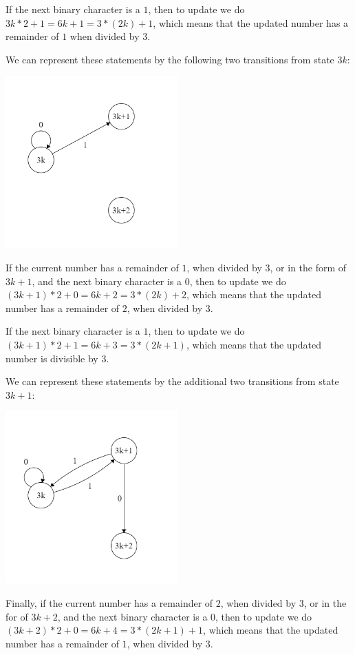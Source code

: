 If the next binary character is a $1$, then to update we do $3k*2+1=6k+1=3*(2k)+1$, which means that the updated number has a remainder of $1$ when divided by $3$.

We can represent these statements by the following two transitions from state $3k$:

\includegraphics[width=250px]{02/modulo_1.png}

If the current number has a remainder of $1$, when divided by $3$, or in the form of $3k+1$, and the next binary character is a $0$, then to update we do $(3k+1)*2+0=6k+2=3*(2k)+2$, which means that the updated number has a remainder of $2$, when divided by $3$.

If the next binary character is a $1$, then to update we do $(3k+1)*2+1=6k+3=3*(2k+1)$, which means that the updated number is divisible by $3$.

We can represent these statements by the additional two transitions from state $3k+1$:

\includegraphics[width=250px]{02/modulo_2.png}

Finally, if the current number has a remainder of $2$, when divided by $3$, or in the for of $3k+2$, and the next binary character is a $0$, then to update we do $(3k+2)*2+0=6k+4=3*(2k+1)+1$, which means that the updated number has a remainder of $1$, when divided by $3$.

